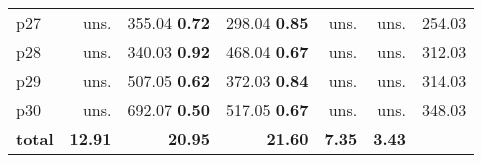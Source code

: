 \begin{tabular}{|l|rrrrr|r|}
p27 & uns. & {\footnotesize 355.04} \textbf{0.72} & {\footnotesize 298.04} \textbf{0.85} & uns. & uns. & 254.03\\
p28 & uns. & {\footnotesize 340.03} \textbf{0.92} & {\footnotesize 468.04} \textbf{0.67} & uns. & uns. & 312.03\\
p29 & uns. & {\footnotesize 507.05} \textbf{0.62} & {\footnotesize 372.03} \textbf{0.84} & uns. & uns. & 314.03\\
p30 & uns. & {\footnotesize 692.07} \textbf{0.50} & {\footnotesize 517.05} \textbf{0.67} & uns. & uns. & 348.03\\
\hline
\textbf{total} & \textbf{12.91} & \textbf{20.95} & \textbf{21.60} & \textbf{7.35} & \textbf{3.43} & \\
\hline
\end{tabular}

